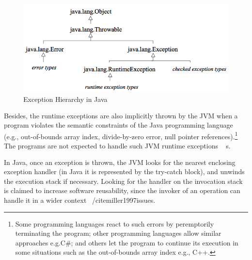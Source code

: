 \documentclass[conference]{IEEEtran}
\begin{document}
\begin{figure} \centering \includegraphics[width=\hsize]{new2_hierarchy.png}
  \caption{Exception Hierarchy in Java} \label{fig:exchier} \end{figure}


Besides, the runtime exceptions are also implicitly thrown by the JVM when a program violates 
the semantic constraints of the Java programming language (e.g., out-of-bounds array index, divide-by-zero 
error, null pointer references).\footnote{Some programming languages react to such errors by peremptorily terminating the program; 
other programming languages allow similar approaches e.g.C\#; and others let the program to continue
 its execution in some situations such as the out-of-bounds array index e.g., C++. }  
The programs are not expected to handle such JVM runtime exceptions ~\cite{gosling2000java} s. 



In Java, once an exception is thrown, the JVM looks for the nearest enclosing exception handler
(in Java it is represented by the try-catch block), and unwinds the execution stack if necessary.
 Looking for the handler on the invocation stack is claimed to increase software reusability, 
since the invoker of an operation can handle it in a wider context ~/cite{miller1997issues}.
\end{document}
